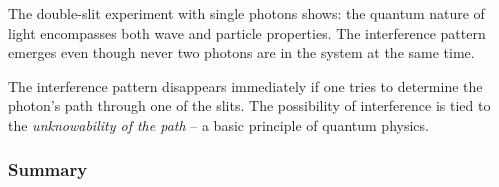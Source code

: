 \vspace{1em}
\begin{tcolorbox}[hypobox, title=Key Idea]
	\label{box:schlüsselidee}
	\small
	The double-slit experiment with single photons shows: the quantum nature of light encompasses both wave and particle properties. The interference pattern emerges even though never two photons are in the system at the same time.
\end{tcolorbox}
\vspace{1em}
\begin{tcolorbox}[didaktikbox, title=Wave as well as Particle Properties]
	\label{box:wellen}
	\small
	The interference pattern disappears immediately if one tries to determine the photon’s path through one of the slits. The possibility of interference is tied to the \emph{unknowability of the path} – a basic principle of quantum physics.
\end{tcolorbox}

\subsubsection*{Summary}

